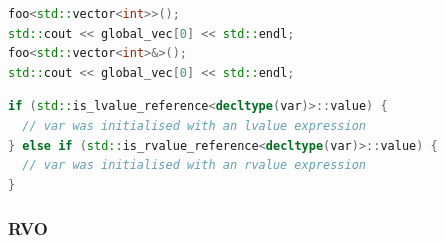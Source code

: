 \documentclass[a4paper,12pt,twoside]{book}
\begin{document}
\begin{itemize}
\begin{lstlisting}[frame=single, language=c++]
foo<std::vector<int>>();
std::cout << global_vec[0] << std::endl;
foo<std::vector<int>&>();
std::cout << global_vec[0] << std::endl;
\end{lstlisting}


\begin{lstlisting}[frame=single, language=c++]
if (std::is_lvalue_reference<decltype(var)>::value) {
  // var was initialised with an lvalue expression
} else if (std::is_rvalue_reference<decltype(var)>::value) {
  // var was initialised with an rvalue expression
}
\end{lstlisting}


\end{itemize}


\subsubsection{RVO}
\end{document}
